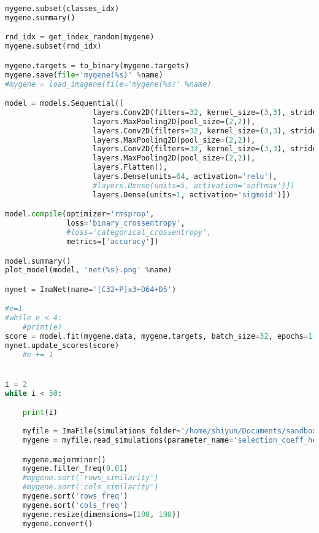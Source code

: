 \begin{lstlisting}[language=Python,breaklines]
mygene.subset(classes_idx)
mygene.summary()

rnd_idx = get_index_random(mygene)
mygene.subset(rnd_idx)

mygene.targets = to_binary(mygene.targets)
mygene.save(file='mygene(%s)' %name)
#mygene = load_imagene(file='mygene(%s)' %name)

model = models.Sequential([
                    layers.Conv2D(filters=32, kernel_size=(3,3), strides=(1,1), activation='relu', kernel_regularizer=regularizers.l1_l2(l1=0.005, l2=0.005), padding='valid', input_shape=mygene.data.shape[1:4]),
                    layers.MaxPooling2D(pool_size=(2,2)),
                    layers.Conv2D(filters=32, kernel_size=(3,3), strides=(1,1), activation='relu', kernel_regularizer=regularizers.l1_l2(l1=0.005, l2=0.005), padding='valid'),
                    layers.MaxPooling2D(pool_size=(2,2)),
                    layers.Conv2D(filters=32, kernel_size=(3,3), strides=(1,1), activation='relu', kernel_regularizer=regularizers.l1_l2(l1=0.005, l2=0.005), padding='valid'),
                    layers.MaxPooling2D(pool_size=(2,2)),
                    layers.Flatten(),
                    layers.Dense(units=64, activation='relu'),
                    #layers.Dense(units=5, activation='softmax')])
                    layers.Dense(units=1, activation='sigmoid')])

model.compile(optimizer='rmsprop',
              loss='binary_crossentropy',
              #loss='categorical_crossentropy',
              metrics=['accuracy'])

model.summary()
plot_model(model, 'net(%s).png' %name)

mynet = ImaNet(name='[C32+P]x3+D64+D5')

#e=1
#while e < 4:
    #print(e)
score = model.fit(mygene.data, mygene.targets, batch_size=32, epochs=1, verbose=1, validation_split=0.10)
mynet.update_scores(score)
    #e += 1


i = 2
while i < 50:

    print(i)
    
    myfile = ImaFile(simulations_folder='/home/shiyun/Documents/sandbox/Binary3/Simulations' + str(i) + '.Epoch3', nr_samples=198, model_name='3epoch-CEU')
    mygene = myfile.read_simulations(parameter_name='selection_coeff_hetero', max_nrepl=2000)

    mygene.majorminor()
    mygene.filter_freq(0.01)
    #mygene.sort('rows_similarity')
    #mygene.sort('cols_similarity')
    mygene.sort('rows_freq')
    mygene.sort('cols_freq')
    mygene.resize(dimensions=(198, 198))
    mygene.convert()


\end{lstlisting}
